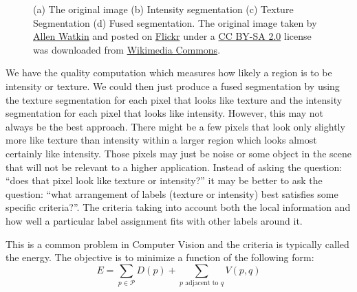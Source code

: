 \documentclass[twocolumn]{article}
\begin{document}
\begin{figure}[!t]
\hfil
{}
\caption{(a) The original image (b) Intensity segmentation (c) Texture
Segmentation (d) Fused segmentation. The original image taken by 
\href{https://www.flickr.com/photos/allenthepostman/}
{\color{blue}Allen Watkin}
and posted on 
\href{https://www.flickr.com/photos/allenthepostman/3407703154/}
{\color{blue}Flickr} 
under a  
\href{http://creativecommons.org/licenses/by-sa/2.0}
{\color{blue}CC BY-SA 2.0} 
license 
\href{http://creativecommons.org/licenses/by-sa/2.0} 
{\ccbysa}
was downloaded from 
\href{https://commons.wikimedia.org/wiki/File\%3ABest_Friends_(3407703154).jpg}
{\color{blue}Wikimedia Commons}.
}
                              
\label{segs}
\end{figure}

We have the quality computation which measures how likely a
region is to be intensity or texture. We could then just
produce a fused segmentation by using the texture segmentation
for each pixel that looks like texture and the intensity
segmentation for each pixel that looks like
intensity. However, this may not always be the best
approach. There might be a few pixels that look only slightly
more like texture than intensity within a larger region which
looks almost certainly like intensity. Those pixels may just
be noise or some object in the scene that will not be relevant
to a higher application. Instead of asking the question:
``does that pixel look like texture or intensity?'' it may be
better to ask the question: ``what arrangement of labels
(texture or intensity) best satisfies some specific
criteria?''. The criteria taking into account both the local
information and how well a particular label assignment fits
with other labels around it. 

This is a common problem in Computer Vision and the criteria
is typically called the energy. The objective is to minimize a
function of the following form: 
\begin{equation*}
 E = \sum_{p \in \mathcal{P}} D(p) + \sum_{p \text{ adjacent to } q} V(p,q)
\end{equation*}
\end{document}
